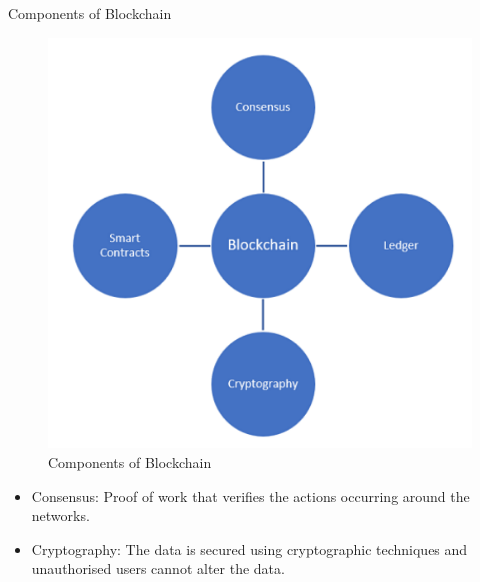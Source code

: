 \documentclass{beamer}
\begin{document}
\begin{frame}{Components of Blockchain \cite{sw_hw_sec_2021}}

\begin{minipage}{0.5\textwidth}
        \begin{figure}
           \centering
           \includegraphics[width=0.75\linewidth]{pic/blockchain_components.png}
           \caption{Components of Blockchain}
          \label{fig:components-of-blockchain-2}
      \end{figure}
\end{minipage}%
\begin{minipage}{0.5\textwidth}
    \centering
    \begin{itemize}
        \item {Consensus: Proof of work that verifies the actions occurring around the networks.}
        \item {Cryptography: The data is secured using cryptographic techniques and unauthorised users cannot alter the data.}
    \end{itemize}
\end{minipage}
\end{frame}
\end{document}
